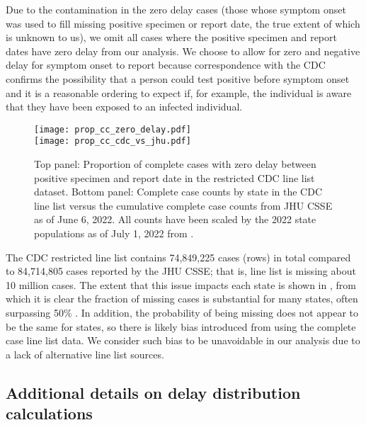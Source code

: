 Due to the contamination in the zero delay cases (those whose symptom onset was
used to fill missing positive specimen or report date, the true extent of which
is unknown to us), we omit all cases where the positive specimen and report
dates have zero delay from our analysis. We choose to allow for zero and
negative delay for symptom onset to report because correspondence with the CDC
confirms the possibility that a person could test positive before symptom onset
and it is a reasonable ordering to expect if, for example, the individual is
aware that they have been exposed to an infected individual.

\begin{figure}[!tb]
\centering
\texttt{[image: prop\_cc\_zero\_delay.pdf]}\\
\texttt{[image: prop\_cc\_cdc\_vs\_jhu.pdf]} 
\caption{Top panel: Proportion of complete cases with zero delay between
    positive specimen and report date in the restricted CDC line list dataset.
    Bottom panel: Complete case counts by state in the CDC line list versus the
    cumulative complete case counts from JHU CSSE as of June 6, 2022. All
    counts have been scaled by the 2022 state populations as of July 1, 2022
    from \citep{uscensus2022annual}.}
\label{fig:prop-cc}
\end{figure}

The CDC restricted line list contains 74,849,225 cases (rows) in total compared
to 84,714,805 cases reported by the JHU CSSE; that is, line list is missing
about 10 million cases. The extent that this issue impacts each state is shown
in , from which it is clear the fraction of missing cases is
substantial for many states, often surpassing 50\% \citep{jahja2022real}. In
addition, the probability of being missing does not appear to be the same for
states, so there is likely bias introduced from using the complete case line
list data. We consider such bias to be unavoidable in our analysis due to a lack
of alternative line list sources. 





\subsection{Additional details on delay distribution calculations}
\label{supp:delay-justifications}

